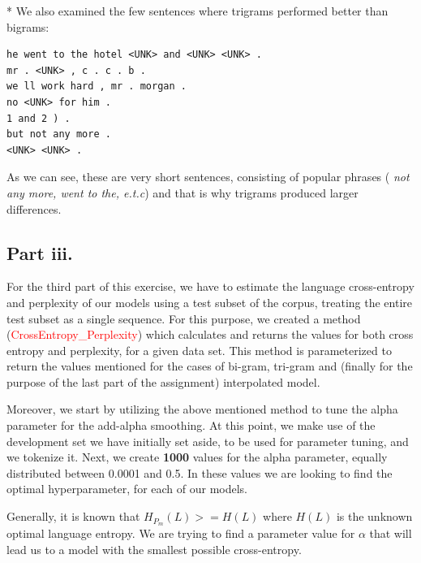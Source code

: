 \documentclass[11pt]{article}
\begin{document}
* We also examined the few sentences where trigrams performed better than bigrams:
\begin{verbatim}
he went to the hotel <UNK> and <UNK> <UNK> .
mr . <UNK> , c . c . b .
we ll work hard , mr . morgan .
no <UNK> for him .
1 and 2 ) .
but not any more .
<UNK> <UNK> .
\end{verbatim}

As we can see, these are very short sentences, consisting of popular phrases ( \textit{not any more, went to the, e.t.c}) and that is why trigrams produced larger differences.

\newpage
\subsection*{Part iii.}
 
For the third part of this exercise, we have to estimate the language cross-entropy and perplexity of our models using a test subset of the corpus, treating the entire test subset as a single sequence. For this purpose, we created a method (\textcolor{red}{CrossEntropy\_Perplexity}) which calculates and returns the values for both cross entropy and perplexity, for a given data set. This method is parameterized to return the values mentioned for the cases of bi-gram, tri-gram and (finally for the purpose of the last part of the assignment) interpolated model.

Moreover, we start by utilizing the above mentioned method to tune the alpha parameter for the add-alpha smoothing. At this point, we make use of the development set we have initially set aside, to be used for parameter tuning, and we tokenize it. Next, we create \textbf{1000} values for the alpha parameter, equally distributed between 0.0001 and 0.5. In these values we are looking to find the optimal hyperparameter, for each of our models. 

Generally, it is known that $H_{P_m}(L)>=H(L)$ where $H(L)$ is the unknown optimal language entropy. We are trying to find a parameter value for $\alpha$ that will lead us to a model with the smallest possible cross-entropy.

\end{document}
